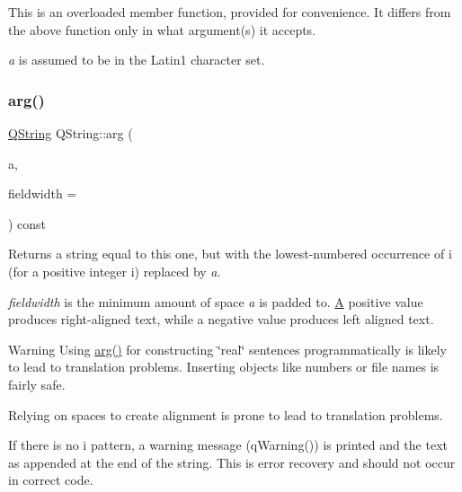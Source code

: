 This is an overloaded member function, provided for convenience. It differs from the above function only in what argument(s) it accepts.

{\itshape a} is assumed to be in the Latin1 character set. \mbox{\label{class_q_string_ac7bcea77370989a0da1a1952d8d763ec}} 
\subsubsection{\texorpdfstring{arg()}{arg()}\hspace{0.1cm}{\footnotesize\ttfamily [2/10]}}
{\footnotesize\ttfamily \mbox{\hyperlink{class_q_string}{Q\+String}} Q\+String\+::arg (\begin{DoxyParamCaption}\item[{const \mbox{\hyperlink{class_q_string}{Q\+String}} \&}]{a,  }\item[{int}]{fieldwidth = {} }\end{DoxyParamCaption}) const}

Returns a string equal to this one, but with the lowest-\/numbered occurrence of {\ttfamily i} (for a positive integer i) replaced by {\itshape a}.


\begin{DoxyCode}{0}
\end{DoxyCode}


{\itshape fieldwidth} is the minimum amount of space {\itshape a} is padded to. \mbox{\hyperlink{class_a}{A}} positive value produces right-\/aligned text, while a negative value produces left aligned text.

\begin{DoxyWarning}{Warning}
Using \mbox{\hyperlink{class_q_string_a16bc2c0a1d3e66872697a0d772aac0cf}{arg()}} for constructing \char`\"{}real\char`\"{} sentences programmatically is likely to lead to translation problems. Inserting objects like numbers or file names is fairly safe.

Relying on spaces to create alignment is prone to lead to translation problems.
\end{DoxyWarning}
If there is no {\ttfamily i} pattern, a warning message (q\+Warning()) is printed and the text as appended at the end of the string. This is error recovery and should not occur in correct code.

